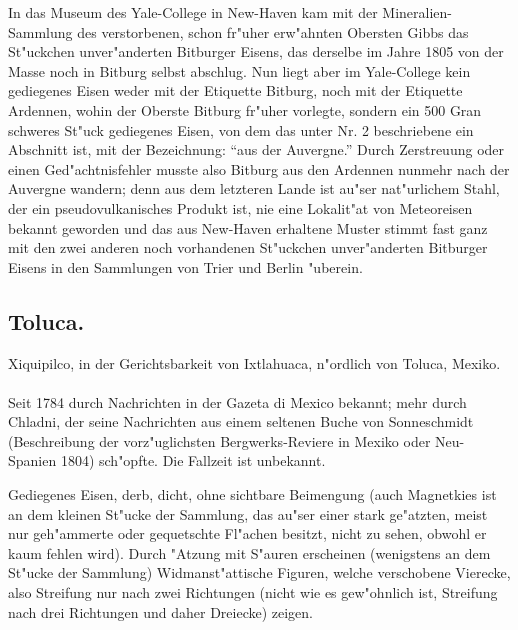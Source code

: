 \documentclass[a4paper, 11pt, oneside, polutonikogreek, german]{article}
\begin{document}
{\footnotesize In das Museum des Yale-College in New-Haven kam mit der Mineralien-Sammlung des verstorbenen, schon fr"uher erw"ahnten Obersten Gibbs das St"uckchen unver"anderten Bitburger Eisens, das derselbe im Jahre 1805 von der Masse noch in Bitburg selbst abschlug. Nun liegt aber im Yale-College kein gediegenes Eisen weder mit der Etiquette Bitburg, noch mit der Etiquette Ardennen, wohin der Oberste Bitburg fr"uher vorlegte, sondern ein 500 Gran schweres St"uck gediegenes Eisen, von dem das unter Nr. 2 beschriebene ein Abschnitt ist, mit der Bezeichnung: "`aus der Auvergne."' Durch Zerstreuung oder einen Ged"achtnisfehler musste also Bitburg aus den Ardennen nunmehr nach der Auvergne wandern; denn aus dem letzteren Lande ist au"ser nat"urlichem Stahl, der ein pseudovulkanisches Produkt ist, nie eine Lokalit"at von Meteoreisen bekannt geworden und das aus New-Haven erhaltene Muster stimmt fast ganz mit den zwei anderen noch vorhandenen St"uckchen unver"anderten Bitburger Eisens in den Sammlungen von Trier und Berlin "uberein.}

\setlength{\leftskip}{0pt}
\setlength{\parindent}{20pt}

\subsection{Toluca.}
\begin{center}
\small
Xiquipilco, in der Gerichtsbarkeit von Ixtlahuaca, n"ordlich von Toluca, Mexiko.
\end{center}
\paragraph{}
Seit 1784 durch Nachrichten in der Gazeta di Mexico bekannt; mehr durch Chladni, der seine Nachrichten aus einem seltenen Buche von Sonneschmidt (Beschreibung der vorz"uglichsten Bergwerks-Reviere in Mexiko oder Neu-Spanien 1804) sch"opfte. Die Fallzeit ist unbekannt.

Gediegenes Eisen, derb, dicht, ohne sichtbare Beimengung (auch Magnetkies ist an dem kleinen St"ucke der Sammlung, das au"ser einer stark ge"atzten, meist nur geh"ammerte oder gequetschte Fl"achen besitzt, nicht zu sehen, obwohl er kaum fehlen wird). Durch "Atzung mit S"auren erscheinen (wenigstens an dem St"ucke der Sammlung) Widmanst"attische Figuren, welche verschobene Vierecke, also Streifung nur nach zwei Richtungen (nicht wie es gew"ohnlich ist, Streifung nach drei Richtungen und daher Dreiecke) zeigen.
\end{document}
